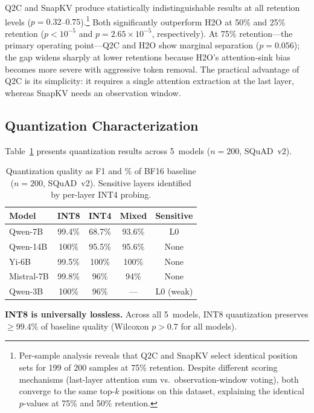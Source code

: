 \documentclass[journal]{IEEEtran}
\newcommand{\QtoC}{\textsc{Q2C}\xspace}
\begin{document}
\QtoC and SnapKV produce statistically indistinguishable results at all retention levels ($p = 0.32$--$0.75$).\footnote{Per-sample analysis reveals that \QtoC and SnapKV select identical position sets for 199 of 200 samples at 75\% retention. Despite different scoring mechanisms (last-layer attention sum vs.\ observation-window voting), both converge to the same top-$k$ positions on this dataset, explaining the identical $p$-values at 75\% and 50\% retention.}
Both significantly outperform H2O at 50\% and 25\% retention ($p < 10^{-5}$ and $p = 2.65 \times 10^{-5}$, respectively).
At 75\% retention---the primary operating point---Q2C and H2O show marginal separation ($p = 0.056$); the gap widens sharply at lower retentions because H2O's attention-sink bias~\cite{streamingllm} becomes more severe with aggressive token removal.
The practical advantage of \QtoC is its simplicity: it requires a single attention extraction at the last layer, whereas SnapKV needs an observation window.

\subsection{Quantization Characterization}

Table~\ref{tab:quantization} presents quantization results across 5~models ($n = 200$, SQuAD~v2).

\begin{table}[t]
\centering
\caption{Quantization quality as F1 and \% of BF16 baseline ($n = 200$, SQuAD~v2). Sensitive layers identified by per-layer INT4 probing.}
\label{tab:quantization}
\small
\begin{tabular}{@{}lcccc@{}}
\toprule
\textbf{Model} & \textbf{INT8} & \textbf{INT4} & \textbf{Mixed} & \textbf{Sensitive} \\
\midrule
Qwen-7B    & 99.4\% & 68.7\% & 93.6\% & L0 \\
Qwen-14B   & 100\%  & 95.5\% & 95.6\% & None \\
Yi-6B      & 99.5\% & 100\%  & 100\%  & None \\
Mistral-7B & 99.8\% & 96\%   & 94\%   & None \\
Qwen-3B    & 100\%  & 96\%   & ---    & L0 (weak) \\
\bottomrule
\end{tabular}
\end{table}

\textbf{INT8 is universally lossless.}
Across all 5~models, INT8 quantization preserves $\geq$99.4\% of baseline quality (Wilcoxon $p > 0.7$ for all models).
\end{document}
